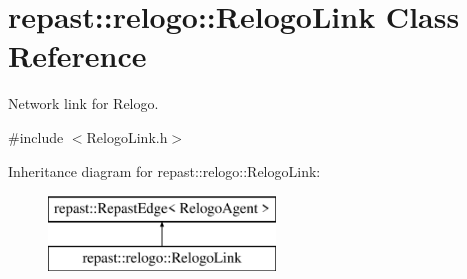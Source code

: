 \hypertarget{classrepast_1_1relogo_1_1_relogo_link}{\section{repast\-:\-:relogo\-:\-:Relogo\-Link Class Reference}
\label{classrepast_1_1relogo_1_1_relogo_link}
}


Network link for Relogo.  




{\ttfamily \#include $<$Relogo\-Link.\-h$>$}

Inheritance diagram for repast\-:\-:relogo\-:\-:Relogo\-Link\-:\begin{figure}[H]
\begin{center}
\leavevmode
\includegraphics[height=2.000000cm]{classrepast_1_1relogo_1_1_relogo_link}
\end{center}
\end{figure}

